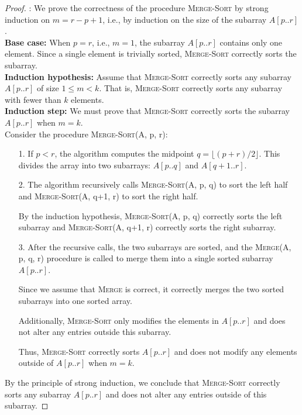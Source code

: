 \documentclass[12pt]{article}
\newcommand{\vs}{\vspace{2mm}}
\begin{document}
\begin{proof}:
We prove the correctness of the procedure \textsc{Merge-Sort} by strong induction on $m = r - p + 1$, i.e., by induction on the size of the subarray $A[p..r]$. \\

\textbf{Base case:} When $p = r$, i.e., $m = 1$, the subarray $A[p..r]$ contains only one element. Since a single element is trivially sorted, \textsc{Merge-Sort} correctly sorts the subarray. \\

\textbf{Induction hypothesis:} Assume that \textsc{Merge-Sort} correctly sorts any subarray $A[p..r]$ of size $1 \leq m < k$. That is, \textsc{Merge-Sort} correctly sorts any subarray with fewer than $k$ elements. \\

\textbf{Induction step:} We must prove that \textsc{Merge-Sort} correctly sorts the subarray $A[p..r]$ when $m = k$. \\

Consider the procedure \textsc{Merge-Sort}(A, p, r):

\begin{itemize}
    \item[1. ] If $p < r$, the algorithm computes the midpoint $q = \lfloor (p + r) / 2 \rfloor$. This divides the array into two subarrays: $A[p..q]$ and $A[q+1..r]$.
    \item[2. ] The algorithm recursively calls \textsc{Merge-Sort}(A, p, q) to sort the left half and \textsc{Merge-Sort}(A, q+1, r) to sort the right half.
    
    By the induction hypothesis, \textsc{Merge-Sort}(A, p, q) correctly sorts the left subarray and \textsc{Merge-Sort}(A, q+1, r) correctly sorts the right subarray.

    \item[3. ] After the recursive calls, the two subarrays are sorted, and the \textsc{Merge}(A, p, q, r) procedure is called to merge them into a single sorted subarray $A[p..r]$.

    Since we assume that \textsc{Merge} is correct, it correctly merges the two sorted subarrays into one sorted array.

    Additionally, \textsc{Merge-Sort} only modifies the elements in $A[p..r]$ and does not alter any entries outside this subarray.

    Thus, \textsc{Merge-Sort} correctly sorts $A[p..r]$ and does not modify any elements outside of $A[p..r]$ when $m = k$.
\end{itemize}

By the principle of strong induction, we conclude that \textsc{Merge-Sort} correctly sorts any subarray $A[p..r]$ and does not alter any entries outside of this subarray.
\end{proof}
\vs\
\pagebreak
\end{document}
